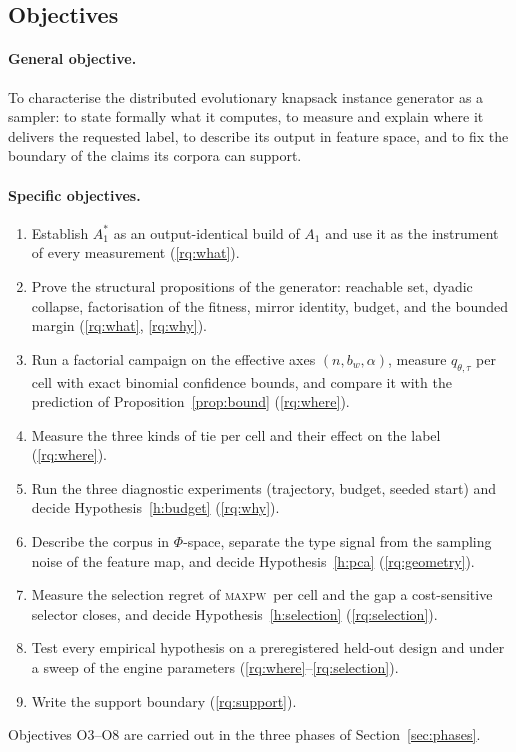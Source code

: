 \documentclass[a4paper,11pt]{article}
\newcommand{\bw}{b_{w}}
\newcommand{\Aone}{A_{1}}
\newcommand{\Astar}{A_{1}^{*}}
\newcommand{\MAXPW}{\textsc{maxpw}}
\theoremstyle{plain}
\theoremstyle{definition}
\theoremstyle{remark}
\begin{document}
\subsection{Objectives}

\paragraph{General objective.} To characterise the distributed evolutionary knapsack instance
generator as a sampler: to state formally what it computes, to measure and explain where it
delivers the requested label, to describe its output in feature space, and to fix the
boundary of the claims its corpora can support.

\paragraph{Specific objectives.}
\begin{enumerate}[label=\textbf{O\arabic*},leftmargin=3em,itemsep=3pt]
\item Establish $\Astar$ as an output-identical build of $\Aone$ and use it as the
instrument of every measurement (\ref{rq:what}).
\item Prove the structural propositions of the generator: reachable set, dyadic collapse,
factorisation of the fitness, mirror identity, budget, and the bounded
margin (\ref{rq:what}, \ref{rq:why}).
\item Run a factorial campaign on the effective axes $(n,\bw,\alpha)$, measure
$q_{\theta,\tau}$ per cell with exact binomial confidence bounds, and compare it with the
prediction of Proposition~\ref{prop:bound} (\ref{rq:where}).
\item Measure the three kinds of tie per cell and their effect on the label (\ref{rq:where}).
\item Run the three diagnostic experiments (trajectory, budget, seeded start) and decide
Hypothesis~\ref{h:budget} (\ref{rq:why}).
\item Describe the corpus in $\Phi$-space, separate the type signal from the sampling noise
of the feature map, and decide Hypothesis~\ref{h:pca} (\ref{rq:geometry}).
\item Measure the selection regret of \MAXPW\ per cell and the gap a cost-sensitive selector
closes, and decide Hypothesis~\ref{h:selection} (\ref{rq:selection}).
\item Test every empirical hypothesis on a preregistered held-out design and under a sweep of
the engine parameters (\ref{rq:where}--\ref{rq:selection}).
\item Write the support boundary (\ref{rq:support}).
\end{enumerate}
Objectives O3--O8 are carried out in the three phases of Section~\ref{sec:phases}.
\end{document}
